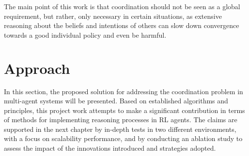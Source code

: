 \documentclass[a4paper,singleside,12pt]{report} %
\begin{document}
The main point of this work is that coordination should not be seen as a global requirement, but rather, only necessary in certain situations, as extensive reasoning about the beliefs and intentions of others can slow down convergence towards a good individual policy and even be harmful.

\chapter{Approach}\label{approach}

In this section, the proposed solution for addressing the coordination problem in multi-agent systems will be presented. Based on established algorithms and principles, this project work attempts to make a significant contribution in terms of methods for implementing reasoning processes in RL agents. The claims are supported in the next chapter by in-depth tests in two different environments, with a focus on scalability performance, and by conducting an ablation study to assess the impact of the innovations introduced and strategies adopted.
\end{document}
